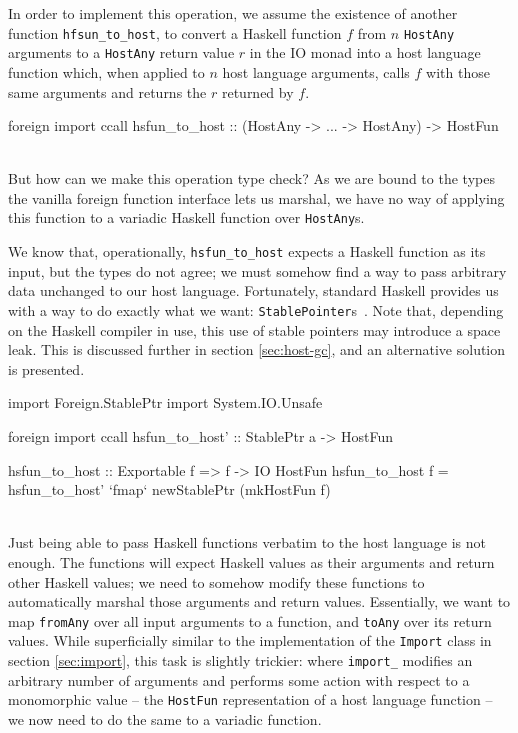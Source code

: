 \documentclass[preprint]{sigplanconf}
\begin{document}
In order to implement this operation, we assume the existence of another
function \lstinline!hfsun_to_host!, to convert a Haskell function $f$ from $n$
\lstinline!HostAny! arguments to a \lstinline!HostAny! return value $r$ in the
IO monad into a host language function which, when applied to $n$ host
language arguments, calls $f$ with those same arguments and returns the $r$
returned by $f$.\\
\begin{code}
  foreign import ccall hsfun_to_host
    :: (HostAny -> ... -> HostAny) -> HostFun
\end{code}\\
But how can we make this operation type check?
As we are bound to the types the vanilla foreign function interface lets us
marshal, we have no way of applying this function to a variadic Haskell
function over \lstinline!HostAny!s.

We know that, operationally, \lstinline!hsfun_to_host! expects a Haskell
function as its input, but the types do not agree; we must somehow find a way
to pass arbitrary data unchanged to our host language.
Fortunately, standard Haskell provides us with a way to do exactly what we want:
\lstinline!StablePointer!s\ \cite{stableptr}. Note that, depending on the
Haskell compiler in use, this use of stable pointers may introduce a space
leak. This is discussed further in section \ref{sec:host-gc}, and an
alternative solution is presented.\\
\begin{code}
  import Foreign.StablePtr
  import System.IO.Unsafe

  foreign import ccall
    hsfun_to_host' :: StablePtr a -> HostFun

  hsfun_to_host :: Exportable f => f -> IO HostFun
  hsfun_to_host f =
    hsfun_to_host' `fmap` newStablePtr (mkHostFun f)
\end{code}\\
Just being able to pass Haskell functions verbatim to the host language is not
enough. The functions will expect Haskell values as their arguments and return
other Haskell values; we need to somehow modify these functions to
automatically marshal those arguments and return values.
Essentially, we want to map
\lstinline!fromAny! over all input arguments to a function, and
\lstinline!toAny! over its return values.
While superficially similar to the implementation of the \lstinline!Import!
class in section \ref{sec:import}, this task is slightly trickier:
where \lstinline!import_! modifies an arbitrary number of arguments and
performs some action with respect to a monomorphic value -- the
\lstinline!HostFun! representation of a host language function -- we now need
to do the same to a variadic function.
\end{document}
